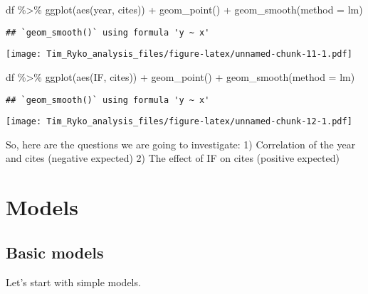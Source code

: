 \documentclass[
]{article}
\newenvironment{Shaded}{\begin{snugshade}}{\end{snugshade}}
\newcommand{\AttributeTok}[1]{\textcolor[rgb]{0.77,0.63,0.00}{#1}}
\newcommand{\FunctionTok}[1]{\textcolor[rgb]{0.00,0.00,0.00}{#1}}
\newcommand{\NormalTok}[1]{#1}
\newcommand{\SpecialCharTok}[1]{\textcolor[rgb]{0.00,0.00,0.00}{#1}}
\newcommand{\StringTok}[1]{\textcolor[rgb]{0.31,0.60,0.02}{#1}}
\begin{document}
\begin{Shaded}
\begin{Highlighting}[]
\NormalTok{df }\SpecialCharTok{\%\textgreater{}\%}
  \FunctionTok{ggplot}\NormalTok{(}\FunctionTok{aes}\NormalTok{(year, cites)) }\SpecialCharTok{+}
  \FunctionTok{geom\_point}\NormalTok{() }\SpecialCharTok{+}
  \FunctionTok{geom\_smooth}\NormalTok{(}\AttributeTok{method =} \StringTok{\textquotesingle{}lm\textquotesingle{}}\NormalTok{)}
\end{Highlighting}
\end{Shaded}

\begin{verbatim}
## `geom_smooth()` using formula 'y ~ x'
\end{verbatim}

\texttt{[image: Tim\_Ryko\_analysis\_files/figure-latex/unnamed-chunk-11-1.pdf]}

\begin{Shaded}
\begin{Highlighting}[]
\NormalTok{df }\SpecialCharTok{\%\textgreater{}\%}
  \FunctionTok{ggplot}\NormalTok{(}\FunctionTok{aes}\NormalTok{(IF, cites)) }\SpecialCharTok{+}
  \FunctionTok{geom\_point}\NormalTok{() }\SpecialCharTok{+}
  \FunctionTok{geom\_smooth}\NormalTok{(}\AttributeTok{method =} \StringTok{\textquotesingle{}lm\textquotesingle{}}\NormalTok{)}
\end{Highlighting}
\end{Shaded}

\begin{verbatim}
## `geom_smooth()` using formula 'y ~ x'
\end{verbatim}

\texttt{[image: Tim\_Ryko\_analysis\_files/figure-latex/unnamed-chunk-12-1.pdf]}

So, here are the questions we are going to investigate: 1) Correlation
of the year and cites (negative expected) 2) The effect of IF on cites
(positive expected)

\hypertarget{models}{%
\section{Models}\label{models}}

\hypertarget{basic-models}{%
\subsection{Basic models}\label{basic-models}}

Let's start with simple models.
\end{document}
